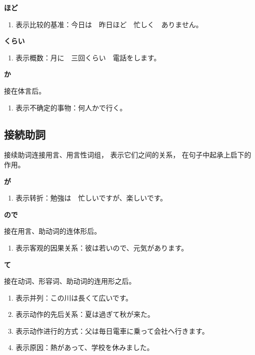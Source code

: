 {\bf
\noindent ほど
}

\begin{enumerate}
  \item 表示比较的基准：今日は　昨日ほど　忙しく　ありません。
\end{enumerate}

{\bf
\noindent くらい 
}

\begin{enumerate}
  \item 表示概数：月に　三回くらい　電話をします。
\end{enumerate}

{\bf
\noindent か
}

接在体言后。
\begin{enumerate}
  \item 表示不确定的事物：何人かで行く。
\end{enumerate}

\subsection{接続助詞}%

接续助词连接用言、用言性词组，
表示它们之间的关系，
在句子中起承上启下的作用。

{\bf
\noindent が
}

\begin{enumerate}
  \item 表示转折：勉強は　忙しいですが、楽しいです。
\end{enumerate}

{\bf
\noindent ので
}

接在用言、助动词的连体形后。
\begin{enumerate}
  \item 表示客观的因果关系：彼は若いので、元気があります。
\end{enumerate}

{\bf
\noindent て
}

接在动词、形容词、助动词的连用形之后。
\begin{enumerate}
  \item 表示并列：この川は長くて広いです。
  \item 表示动作的先后关系：夏は過ぎて秋が来た。
  \item 表示动作进行的方式：父は毎日電車に乗って会社へ行きます。
  \item 表示原因：熱があって、学校を休みました。
\end{enumerate}

